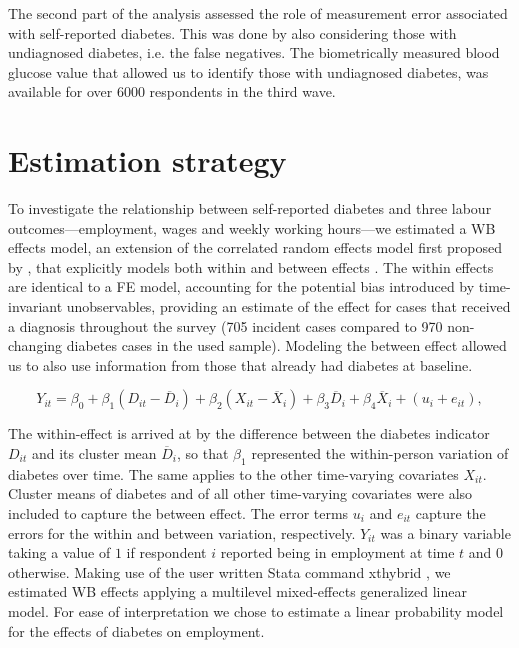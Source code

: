 \documentclass[12pt,english]{article}
\begin{document}
The second part of the analysis assessed the role of measurement error associated with self-reported diabetes. This was done by also considering those with undiagnosed diabetes, i.e. the false negatives. The biometrically measured blood glucose value that allowed us to identify those with undiagnosed diabetes, was available for over 6000 respondents in the third wave.



\section{\label{sec:Estimation Strategy}Estimation strategy}

To investigate the relationship between self-reported diabetes and three labour outcomes---employment, wages and weekly working hours---we estimated a \ac{WB} effects model, an extension of the correlated random effects model first proposed by \textcite{Mundlak1978}, that explicitly models both within and between effects \parencite{Bell2015}. The within effects are identical to a \ac{FE} model, accounting for the potential bias introduced by time-invariant unobservables, providing an estimate of the effect for cases that received a diagnosis throughout the survey (705 incident cases compared to 970 non-changing diabetes cases in the used sample). Modeling the between effect allowed us to also use information from those that already had diabetes at baseline.


\begin{equation}
Y_{it}=\beta_{0}+\beta_{1}(D_{it}-\overline{D}_{i})+\beta_{2}(X_{it}-\overline{X}_i)+\beta_{3}\overline{D}_{i}+\beta_{4}\overline{X}_i+(u_{i}+e_{it}),\label{eq:cha4_employed}
\end{equation}

The within-effect is arrived at by the difference between the diabetes indicator $D_{it}$ and its cluster mean $\overline{D}_{i}$, so that $\beta_{1}$ represented the within-person variation of diabetes over time. The same applies to the other time-varying covariates $X_{it}$. Cluster means of diabetes and of all other time-varying covariates were also included to capture the between effect. The error terms $u_{i}$ and $e_{it}$ capture the errors for the within and between variation, respectively. $Y_{it}$ was a binary variable taking a value of $1$ if respondent $i$ reported being in employment at time $t$ and $0$ otherwise. Making use of the user written Stata command xthybrid \parencite{Schunck2017}, we estimated \ac{WB} effects applying a multilevel mixed-effects generalized linear model. For ease of interpretation we chose to estimate a linear probability model for the effects of diabetes on employment.
\end{document}
